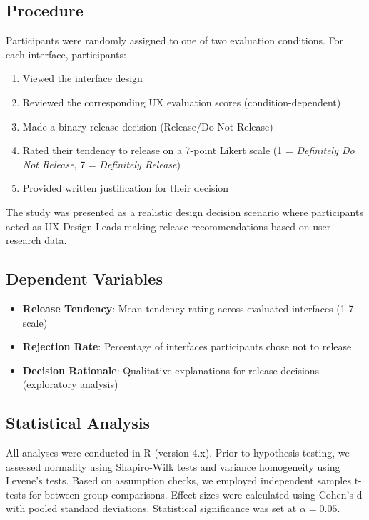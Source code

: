 \subsection{Procedure}
Participants were randomly assigned to one of two evaluation conditions. For each interface, participants:
\begin{enumerate}
    \item Viewed the interface design
    \item Reviewed the corresponding UX evaluation scores (condition-dependent)
    \item Made a binary release decision (Release/Do Not Release)
    \item Rated their tendency to release on a 7-point Likert scale (1 = \textit{Definitely Do Not Release}, 7 = \textit{Definitely Release})
    \item Provided written justification for their decision
\end{enumerate}

The study was presented as a realistic design decision scenario where participants acted as UX Design Leads making release recommendations based on user research data.

\subsection{Dependent Variables}
\begin{itemize}
    \item \textbf{Release Tendency}: Mean tendency rating across evaluated interfaces (1-7 scale)
    \item \textbf{Rejection Rate}: Percentage of interfaces participants chose not to release
    \item \textbf{Decision Rationale}: Qualitative explanations for release decisions (exploratory analysis)
\end{itemize}

\subsection{Statistical Analysis}
All analyses were conducted in R (version 4.x). Prior to hypothesis testing, we assessed normality using Shapiro-Wilk tests and variance homogeneity using Levene's tests. Based on assumption checks, we employed independent samples t-tests for between-group comparisons. Effect sizes were calculated using Cohen's d with pooled standard deviations. Statistical significance was set at $\alpha = 0.05$.

